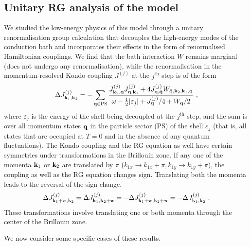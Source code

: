 \documentclass[reprint,hidelinks]{revtex4-2}
\begin{document}
\subsection{Unitary RG analysis of the model}
We studied the low-energy physics of this model through a unitary renormalisation group calculation that decouples the high-energy modes of the conduction bath and incorporates their effects in the form of renormalised Hamiltonian couplings. We find that the bath interaction \(W\) remains marginal (does not undergo any renormalisation), while the renormalisation in the momentum-resolved Kondo coupling \(J^{(j)}\) at the \(j^\text{th}\) step is of the form
\begin{equation}\begin{aligned}\label{KondoRGequation}
	\Delta J^{(j)}_{{\bf k}_1, {\bf k}_2} = -\sum_{{\bf q} \in \text{PS}} \frac{J^{(j)}_{{\bf k}_2,{\bf q}} J^{(j)}_{{\bf q},{\bf k}_1} + 4J^{(j)}_{{\bf q}, {\bf \bar q}} W_{{\bf \bar q}, {\bf k}_2, {\bf k}_1, {\bf q}}}{\omega - \frac{1}{2}|\varepsilon_j| + J^{(j)}_{{\bf q}}/4 + W_{{\bf q}}/2}~,
\end{aligned}\end{equation}
where \(\varepsilon_j\) is the energy of the shell being decoupled at the \(j^\text{th}\) step, and the sum is over all momentum states \({\bf q}\) in the particle sector (PS) of the shell \(\varepsilon_j\) (that is, all states that are occupied at \(T=0\) and in the absence of any quantum fluctuations). The Kondo coupling and the RG equation as well have certain symmetries under transformations in the Brillouin zone. If any one of the momenta \({\bf k}_1\) or \({\bf k}_2\) are translated by \(\pi\) (\(k_{1x} \to k_{1x} + \pi, k_{1y} \to k_{1y}+\pi\)), the coupling as well as the RG equation changes sign. Translating both the momenta leads to the reversal of the sign change. 
\begin{equation}\begin{aligned}
	\Delta J^{(j)}_{{\bf k}_1 + \boldsymbol{\pi}, {\bf k}_2} = \Delta J^{(j)}_{{\bf k}_1, {\bf k}_2 + \boldsymbol{\pi}} = -\Delta J^{(j)}_{{\bf k}_1 + \boldsymbol{\pi}, {\bf k}_2 + \boldsymbol{\pi}} = -\Delta J^{(j)}_{{\bf k}_1, {\bf k}_2}~.
\end{aligned}\end{equation}
These transformations involve translating one or both momenta through the center of the Brillouin zone.

We now consider some specific cases of these results.
\end{document}
